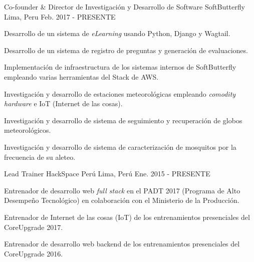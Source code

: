 

\begin{cventries}

  \cventry
    {Co-founder \& Director de Investigación y Desarrollo de Software} %
    {SoftButterfly} %
    {Lima, Peru} %
    {Feb. 2017 - PRESENTE} %
    {
      \begin{cvitems} %
        \item {Desarrollo de un sistema de \textit{eLearning} usando Python, Django y Wagtail.}
        \item {Desarrollo de un sistema de registro de preguntas y generación
        de evaluaciones.}
        \item {Implementación de infraestructura de los sistemas internos de
        SoftButterfly empleando varias herramientas del Stack de AWS.}
        \item {Investigación y desarrollo de estaciones meteorológicas empleando
        \textit{comodity hardware} e IoT (Internet de las cosas).}
        \item {Investigación y desarrollo de sistema de seguimiento y
        recuperación de globos meteorológicos.}
        \item {Investigación y desarrollo de sistema de caracterización de
        mosquitos por la frecuencia de su aleteo.}
      \end{cvitems}
    }

  \cventry
    {Lead Trainer} %
    {HackSpace Perú} %
    {Lima, Perú} %
    {Ene. 2015 - PRESENTE} %
    {
      \begin{cvitems} %
        \item {Entrenador de desarrollo web \textit{full stack} en el PADT 2017
        (Programa de Alto Desempeño Tecnológico) en colaboración con el
        Ministerio de la Producción.}
        \item {Entrenador de Internet de las cosas (IoT) de los entrenamientos
        presenciales del CoreUpgrade 2017.}
        \item {Entrenador de desarrollo web backend de los entrenamientos
        presenciales del CoreUpgrade 2016.}
      \end{cvitems}
    }


\end{cventries}
